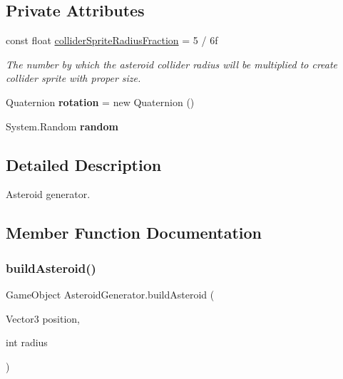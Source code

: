 \subsection*{Private Attributes}
\begin{DoxyCompactItemize}
\item 
const float \mbox{\hyperlink{class_asteroid_generator_ad964b0aa879835d22bc6f81aeb5c5420}{collider\+Sprite\+Radius\+Fraction}} = 5 / 6f
\begin{DoxyCompactList}\small\item\em The number by which the asteroid collider radius will be multiplied to create collider sprite with proper size. \end{DoxyCompactList}\item 
\mbox{\label{class_asteroid_generator_a72473bd4ed85f190e6c60f9aaa9955fa}} 
Quaternion {\bfseries rotation} = new Quaternion ()
\item 
\mbox{\label{class_asteroid_generator_aa116d4867b8d45af5ae2d843d610b2f7}} 
System.\+Random {\bfseries random}
\end{DoxyCompactItemize}


\subsection{Detailed Description}
Asteroid generator. 



\subsection{Member Function Documentation}
\mbox{\label{class_asteroid_generator_a8ee9800524293ee0974caeb3f0077cf5}} 
\subsubsection{\texorpdfstring{build\+Asteroid()}{buildAsteroid()}}
{\footnotesize\ttfamily Game\+Object Asteroid\+Generator.\+build\+Asteroid (\begin{DoxyParamCaption}\item[{Vector3}]{position,  }\item[{int}]{radius }\end{DoxyParamCaption})\hspace{0.3cm}{\ttfamily [private]}}



